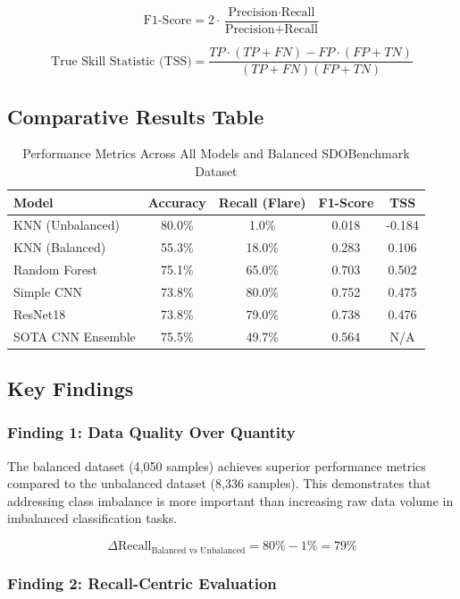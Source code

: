 \documentclass[11pt,a4paper]{article}
\begin{document}
\[
\text{F1-Score} = 2 \cdot \frac{\text{Precision} \cdot \text{Recall}}{\text{Precision} + \text{Recall}}
\]

\[
\text{True Skill Statistic (TSS)} = \frac{TP \cdot (TP + FN) - FP \cdot (FP + TN)}{(TP + FN)(FP + TN)}
\]

\subsection{Comparative Results Table}

\begin{table}[H]
\centering
\begin{tabular}{|l|c|c|c|c|}
\hline
\textbf{Model} & \textbf{Accuracy} & \textbf{Recall (Flare)} & \textbf{F1-Score} & \textbf{TSS} \\
\hline
KNN (Unbalanced) & 80.0\% & 1.0\% & 0.018 & -0.184 \\
KNN (Balanced) & 55.3\% & 18.0\% & 0.283 & 0.106 \\
Random Forest & 75.1\% & 65.0\% & 0.703 & 0.502 \\
Simple CNN & 73.8\% & 80.0\% & 0.752 & 0.475 \\
ResNet18 & 73.8\% & 79.0\% & 0.738 & 0.476 \\
SOTA CNN Ensemble & 75.5\% & 49.7\% & 0.564 & N/A \\
\hline
\end{tabular}
\caption{Performance Metrics Across All Models and Balanced SDOBenchmark Dataset}
\end{table}

\subsection{Key Findings}

\subsubsection{Finding 1: Data Quality Over Quantity}

The balanced dataset (4,050 samples) achieves superior performance metrics compared to the unbalanced dataset (8,336 samples). This demonstrates that addressing class imbalance is more important than increasing raw data volume in imbalanced classification tasks.

\[
\Delta \text{Recall}_{\text{Balanced vs Unbalanced}} = 80\% - 1\% = 79\%
\]

\subsubsection{Finding 2: Recall-Centric Evaluation}
\end{document}
